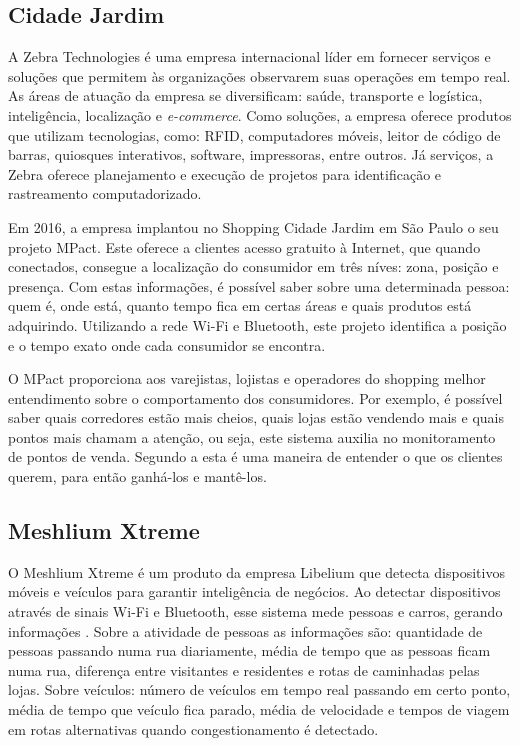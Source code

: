 \subsection{Cidade Jardim}
A Zebra Technologies é uma empresa internacional
líder em fornecer serviços e soluções que permitem às organizações observarem
suas operações em tempo real. As áreas de atuação da empresa se diversificam:
saúde, transporte e logística, inteligência, localização e \emph{e-commerce}.
Como soluções, a empresa oferece produtos que utilizam tecnologias, como: RFID,
computadores móveis, leitor de código de barras, quiosques interativos,
software, impressoras, entre outros. Já serviços, a Zebra oferece planejamento e
execução de projetos para identificação e rastreamento computadorizado.

Em 2016, a empresa implantou no Shopping Cidade Jardim em São Paulo o seu
projeto MPact. Este oferece a clientes acesso gratuito à Internet, que quando
conectados, consegue a localização do consumidor em três níves: zona, posição e
presença. Com estas informações, é possível saber sobre uma determinada pessoa:
quem é, onde está, quanto tempo fica em certas áreas e quais produtos está
adquirindo. Utilizando a rede Wi-Fi e Bluetooth, este projeto identifica a
posição e o tempo exato onde cada consumidor se encontra.

O MPact proporciona aos varejistas, lojistas e operadores do shopping melhor
entendimento sobre o comportamento dos consumidores. Por exemplo, é possível
saber quais corredores estão mais cheios, quais lojas estão vendendo mais e
quais pontos mais chamam a atenção, ou seja, este sistema auxilia no
monitoramento de pontos de venda. Segundo a  esta é uma
maneira de entender o que os clientes querem, para então ganhá-los e mantê-los.

\subsection{Meshlium Xtreme}
O Meshlium Xtreme é um produto da empresa Libelium
que detecta dispositivos móveis e veículos para garantir inteligência de
negócios. Ao detectar dispositivos através de sinais Wi-Fi e Bluetooth, esse
sistema mede pessoas e carros, gerando informações \cite{libelium}. Sobre a
atividade de pessoas as informações são: quantidade de pessoas passando numa rua
diariamente, média de tempo que as pessoas ficam numa rua, diferença entre
visitantes e residentes e rotas de caminhadas pelas lojas. Sobre veículos:
número de veículos em tempo real passando em certo ponto, média de tempo que
veículo fica parado, média de velocidade e tempos de viagem em rotas
alternativas quando congestionamento é detectado.

